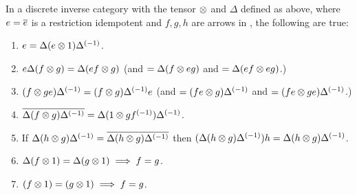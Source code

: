 \begin{lemma}\label{lem:properties_of_delta_and_tensor_in_a_discrete_inverse_category}
  In a discrete inverse category \X with the tensor $\otimes$ and $\Delta$ defined as above, where
  $e=\overline{e}$ is a restriction idempotent and $f,g,h$ are arrows in \X, the following are true:
  \begin{enumerate}[{(}i{)}]
    \item{}$e=\Delta (e\otimes 1) {\Delta}^{(-1)}$.\label{le:eisde1}
    \item{}$e\Delta (f \otimes g) = \Delta (e f \otimes g) $ (and $= \Delta (f \otimes e g) $ and
      $ = \Delta (e f \otimes e g)$.)\label{le:deltaefg}
    \item{}$ (f \otimes g e) {\Delta}^{(-1)} =(f \otimes g) {\Delta}^{(-1)} e $ (and $= (f e\otimes g) {\Delta}^{(-1)}$ and
      $ = (f e\otimes g e){\Delta}^{(-1)}$.)\label{le:efginvdelta}
    \item{}$\overline{\Delta (f \otimes g) {\Delta}^{(-1)}} =
       \Delta(1\otimes g {f}^{(-1)}){\Delta}^{(-1)}$. \label{le:restfg}
    \item{} If $\Delta (h \otimes g) {\Delta}^{(-1)} = \overline{\Delta (h \otimes g) {\Delta}^{(-1)}}$ then
      $(\Delta (h \otimes g) {\Delta}^{(-1)}) h = \Delta (h \otimes g) {\Delta}^{(-1)}$.\label{le:hge}
    \item{}$\Delta (f\otimes1) = \Delta (g\otimes1) \implies f = g$.\label{le:dfgisfg}
    \item{}$(f\otimes1) = (g\otimes1) \implies f = g$.\label{le:fgisfg}
  \end{enumerate}
\end{lemma}
